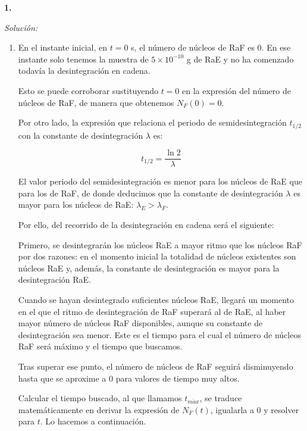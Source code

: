 \textbf{1.}


\vspace{20px}
\textit{Solución:}
\\

\begin{enumerate}
[label=\alph*)]
    \item En el instante inicial, en $t = 0$ s, el número de núcleos de RaF es 0. En ese instante solo tenemos la muestra de $5 \times 10^{-10}$ g de RaE y no
    ha comenzado todavía la desintegración en cadena.

    Esto se puede corroborar sustituyendo $t = 0$ en la expresión del número de núcleos de RaF, de manera que obtenemos $N_F(0) = 0$.

    Por otro lado, la expresión que relaciona el periodo de semidesintegración $t_{1/2}$ con la constante de desintegración $\lambda$ es:

    \begin{equation*}
        t_{1/2} = \frac{\ln 2}{\lambda}
    \end{equation*}

    El valor periodo del semidesintegración es menor para los núcleos de RaE que para los de RaF, de donde deducimos que la constante de desintegración
    $\lambda$ es mayor para los núcleos de RaE:
    $\lambda_{E} > \lambda_{F}$.

    Por ello, del recorrido de la desintegración en cadena será el siguiente:

    Primero, se desintegrarán los núcleos RaE a mayor ritmo que los núcleos RaF por dos razones: en el momento inicial la totalidad de núcleos existentes son
    núcleos RaE y, además, la constante de desintegración es mayor para la desintegración RaE.

    Cuando se hayan desintegrado suficientes núcleos RaE, llegará un momento en el que el ritmo de desintegración de RaF superará al de RaE, al haber mayor número de
    núcleos RaF disponibles, aunque su constante de desintegración sea menor. Este es el tiempo para el cual el número de núcleos RaF será máximo y el tiempo que
    buscamos.

    Tras superar ese punto, el número de núcleos de RaF seguirá disminuyendo hasta que se aproxime a 0 para valores de tiempo muy altos.

    Calcular el tiempo buscado, al que llamamos $t_{m\acute{a}x}$,
    se traduce matemáticamente en derivar la expresión de $N_F (t)$, igualarla a 0 y resolver para $t$. Lo hacemos a continuación.


\end{enumerate}
